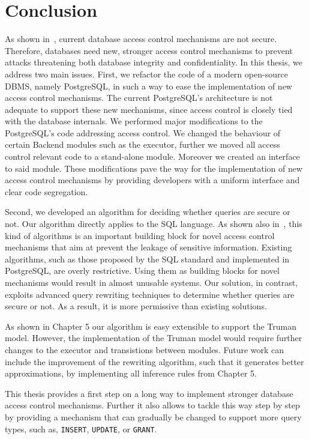 \section{Conclusion}

As shown in~\cite{guarnieri2016strong}, current database access control mechanisms are not secure.
%
Therefore, databases need new, stronger access control mechanisms to prevent attacks threatening both database integrity and confidentiality.
%
In this thesis, we address two main issues.
%
First, we refactor the code of a modern open-source DBMS, namely PostgreSQL, in such a way to ease the implementation of new access control mechanisms.
%
The current PostgreSQL's architecture is not adequate to support these new mechanisms, since access control is closely tied with the database internals.
%
We performed  major modifications to the PostgreSQL's code addressing access control.
%
We changed the behaviour of certain Backend modules such as the executor, further we moved all access control relevant code to a stand-alone module. 
%
Moreover we created an interface to said module.
%
These modifications pave the way for the implementation of new access control mechanisms by providing developers with a uniform interface and clear code segregation.


Second, we developed an algorithm for deciding whether queries are secure or not.
%
Our algorithm directly applies to the SQL language.
%
As shown also in~\cite{guarnieri2016strong}, this kind of algorithms is an important building block for novel access control mechanisms that aim at prevent the leakage of sensitive information.
%
Existing algorithms, such as those proposed by the SQL standard and implemented in PostgreSQL, are overly restrictive.
%
Using them as building blocks for novel mechanisms would result in almost unusable systems.
%
Our solution, in contrast, exploits advanced query rewriting techniques to determine whether queries are secure or not. 
%
As a result, it is more permissive than existing solutions.

As shown in Chapter 5 our algorithm is easy extensible to support the Truman model.
%
However, the implementation of the Truman model would require further changes to the executor and transistions between modules.
%
Future work can include the improvement of the rewriting algorithm, such that it generates better approximations, by implementing all inference rules from Chapter 5.

This thesis provides a first step on a long way to implement stronger database access control mechanisms.
%
Further it also allows to tackle this way step by step by providing a mechanism that can gradually be changed to support more query types, such as, \texttt{INSERT}, \texttt{UPDATE}, or \texttt{GRANT}.
